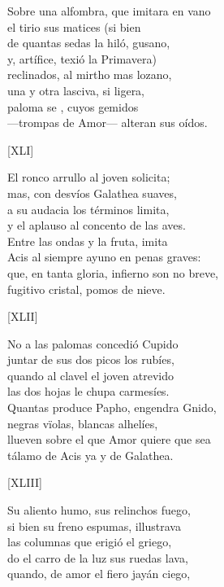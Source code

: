 \documentclass[11pt,a4paper,twoside]{article}
\begin{document}
Sobre una alfombra, que imitara en vano\\
el tirio sus matices (si bien \\
de quantas sedas la hiló, gusano,\\
y, artífice, texió la Primavera)\\
reclinados, al mirtho mas lozano,\\
una y otra lasciva, si ligera,\\
paloma se , cuyos gemidos\\
—trompas de Amor— alteran sus oídos.\pend
\begin{center}
	[XLI]
\end{center}\pstart
El ronco arrullo al joven solicita;\\
mas, con desvíos Galathea suaves,\\
a su audacia los términos limita,\\
y el aplauso al concento de las aves.\\
Entre las ondas y la fruta, imita\\
Acis al siempre ayuno en penas graves:\\
que, en tanta gloria, infierno son no breve,\\
fugitivo cristal, pomos de nieve.\pend
\begin{center}
	[XLII]
\end{center}\pstart
No a las palomas concedió Cupido\\
juntar de sus dos picos los rubíes,\\
quando al clavel el joven atrevido\\
las dos hojas le chupa carmesíes.\\
Quantas produce Papho, engendra Gnido,\\
negras vïolas, blancas alhelíes,\\
llueven sobre el que Amor quiere que sea\\
tálamo de Acis ya y de Galathea.\pend
\begin{center}
	[XLIII]
\end{center}\pstart
Su aliento humo, sus relinchos fuego,\\
si bien su freno espumas, illustrava\\
las columnas  que erigió el griego,\\
do el carro de la luz sus ruedas lava,\\ quando, de amor el fiero jayán ciego,\\
\end{document}
